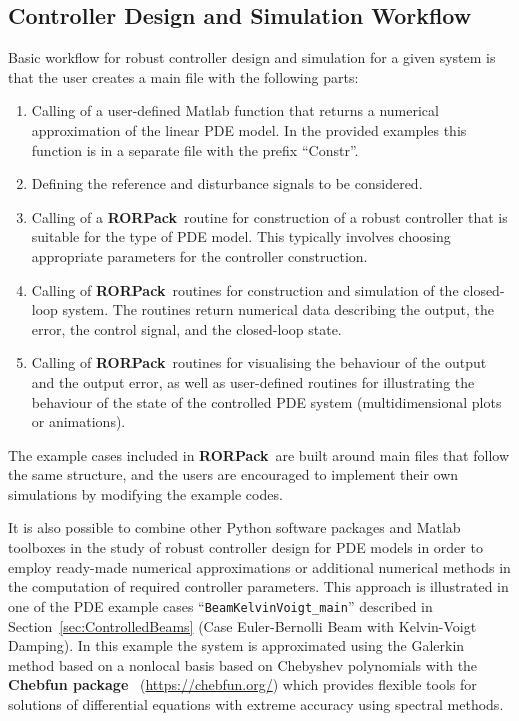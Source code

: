\documentclass[11pt, a4paper]{amsart}
\theoremstyle{definition}
\numberwithin{equation}{section}
\newcommand{\RORname}{\textbf{RORPack}}
\begin{document}
\subsection{Controller Design and Simulation Workflow}

Basic workflow for robust controller design and simulation for a given system is that the user creates a main file with the following parts:
\begin{enumerate}
  \item Calling of a user-defined Matlab function that returns a numerical approximation of the linear PDE model. In the provided examples this function is in a separate file with the prefix ``Constr''.
  \item Defining the reference and disturbance signals to be considered.
  \item Calling of a \RORname\ routine for construction of a robust controller that is suitable for the type of PDE model.
    This typically involves choosing appropriate parameters for the controller construction.
  \item Calling of \RORname\ routines for construction and simulation of the closed-loop system. The routines return numerical data describing the output, the error, the control signal, and the closed-loop state.
  \item Calling of \RORname\ routines for visualising the behaviour of the output and the output error, as well as 
    user-defined routines for illustrating the behaviour of the state of the controlled PDE system (multidimensional plots or animations).
\end{enumerate}
The example cases included in \RORname\ are built around main files that follow the same structure, and the users are encouraged to implement their own simulations by modifying the example codes.

It is also possible to combine other Python software packages and Matlab toolboxes in the study of robust controller design for PDE models in order to employ ready-made numerical approximations or additional numerical methods in the computation of required controller parameters. This approach is illustrated in one of the PDE example cases ``\texttt{BeamKelvinVoigt\_main}'' described in Section~\ref{sec:ControlledBeams} (Case Euler-Bernolli Beam with Kelvin-Voigt Damping).
In this example the system is approximated using the Galerkin method based on a nonlocal basis based on Chebyshev polynomials with the \textbf{Chebfun package}~\cite{DriHal14book} (\href{https://chebfun.org/}{https://chebfun.org/}) which provides flexible tools for solutions of differential equations with extreme accuracy using spectral methods. 
\end{document}

